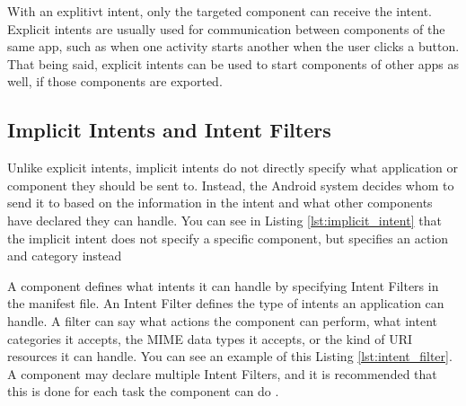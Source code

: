     
    
    With an explitivt intent, only the targeted component can receive the intent. Explicit intents are usually used for communication between components of the same app, such as when one activity starts another when the user clicks a button. That being said, explicit intents can be used to start components of other apps as well, if those components are exported.
    
    \subsection{Implicit Intents and Intent Filters}
        \label{subsec:implicit_intents}
        
    Unlike explicit intents, implicit intents do not directly specify what application or component they should be sent to. Instead, the Android system decides whom to send it to based on the information in the intent and what other components have declared they can handle. You can see in Listing \ref{lst:implicit_intent} that the implicit intent does not specify a specific component, but specifies an action and category instead
    
    A component defines what intents it can handle by specifying Intent Filters in the manifest file. An Intent Filter defines the type of intents an application can handle. A filter can say what actions the component can perform, what intent categories it accepts, the MIME data types it accepts, or the kind of URI resources it can handle. You can see an example of this Listing \ref{lst:intent_filter}. A component may declare multiple Intent Filters, and it is recommended that this is done for each task the component can do \cite{intents_and_intent_filters}.
    
    
    
    
    
